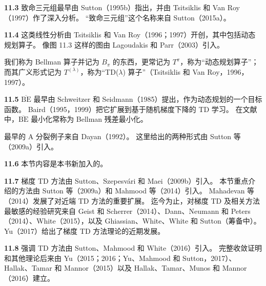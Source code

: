 \documentclass[UTF8, 12pt, fontset=fandol, oneside]{ctexart}
\begin{document}
\noindent\textbf{11.3}
致命三元组最早由 Sutton（1995b）指出，并由 Tsitsiklis 和 Van Roy（1997）作了深入分析。
“致命三元组”这个名称来自 Sutton（2015a）。

\noindent\textbf{11.4}
这类线性分析由 Tsitsiklis 和 Van Roy（1996；1997）开创，其中包括动态规划算子。
像图 11.3 这样的图由 Lagoudakis 和 Parr（2003）引入。

我们称为 Bellman 算子并记为 $B_\pi$ 的东西，更常记为 $T^\pi$，称为“动态规划算子”；而其广义形式记为 $T^{(\lambda)}$，称为“TD($\lambda$) 算子”（Tsitsiklis 和 Van Roy，1996，1997）。

\noindent\textbf{11.5}
$\overline{\mathrm{BE}}$ 最早由 Schweitzer 和 Seidmann（1985）提出，作为动态规划的一个目标函数。
Baird（1995，1999）把它扩展到基于随机梯度下降的 TD 学习。
在文献中，$\overline{\mathrm{BE}}$ 最小化常称为 Bellman 残差最小化。

最早的 A 分裂例子来自 Dayan（1992）。
这里给出的两种形式由 Sutton 等（2009a）引入。

\noindent\textbf{11.6}
本节内容是本书新加入的。

\noindent\textbf{11.7}
梯度 TD 方法由 Sutton、Szepesvári 和 Maei（2009b）引入。
本节重点介绍的方法由 Sutton 等（2009a）和 Mahmood 等（2014）引入。
Mahadevan 等（2014）发展了对近端 TD 方法的重要扩展。
迄今为止，对梯度 TD 及相关方法最敏感的经验研究来自 Geist 和 Scherrer（2014）、Dann、Neumann 和 Peters（2014）、White（2015），以及 Ghiassian、White、White 和 Sutton（筹备中）。
Yu（2017）给出了梯度 TD 方法理论的近期发展。

\noindent\textbf{11.8}
强调 TD 方法由 Sutton、Mahmood 和 White（2016）引入。
完整收敛证明和其他理论后来由 Yu（2015；2016；Yu、Mahmood 和 Sutton，2017）、Hallak、Tamar 和 Mannor（2015）以及 Hallak、Tamar、Munos 和 Mannor（2016）建立。
\end{document}
